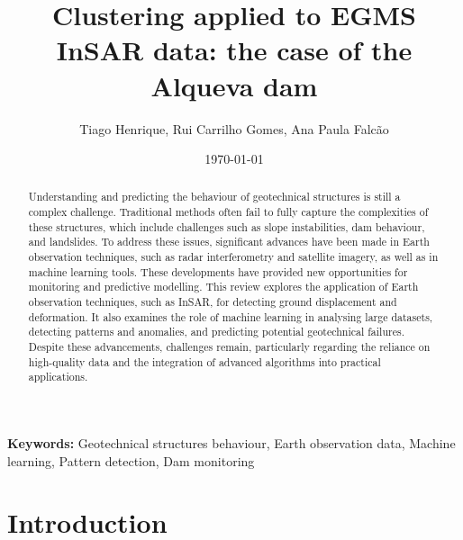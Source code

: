 \documentclass[11pt,a4paper]{article}
\title{Clustering applied to EGMS InSAR data: the case of the Alqueva dam}
\author{
Tiago Henrique, %
Rui Carrilho Gomes, %
Ana Paula Falcão %
}
\date{\today}
\begin{document}
\maketitle

{\setlength{\parskip}{0pt}
\noindent\textbf{Keywords:} Geotechnical structures behaviour, Earth observation data, Machine learning, Pattern detection, Dam monitoring

\begin{abstract}
Understanding and predicting the behaviour of geotechnical structures is still a complex challenge. Traditional methods often fail to fully capture the complexities of these structures, which include challenges such as slope instabilities, dam behaviour, and landslides. To address these issues, significant advances have been made in Earth observation techniques, such as radar interferometry and satellite imagery, as well as in machine learning tools. These developments have provided new opportunities for monitoring and predictive modelling.
This review explores the application of Earth observation techniques, such as InSAR, for detecting ground displacement and deformation. It also examines the role of machine learning in analysing large datasets, detecting patterns and anomalies, and predicting potential geotechnical failures. Despite these advancements, challenges remain, particularly regarding the reliance on high-quality data and the integration of advanced algorithms into practical applications.
\end{abstract}
}

\setlength{\parskip}{0.8em}

\section{Introduction}


\end{document}
